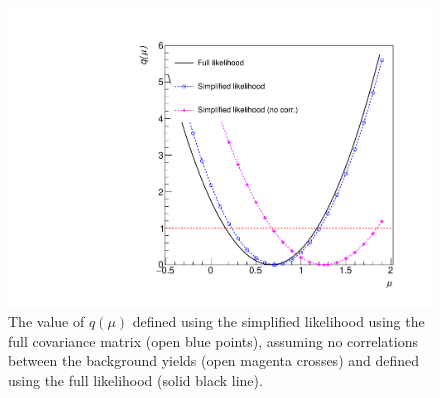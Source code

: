 \begin{figure}[hbt]
  \begin{center} 
   \includegraphics[width=1.5\cmsFigWidth]{figures/r.pdf}
   \caption{The value of $q(\mu)$ defined using the simplified likelihood using the full covariance matrix (open blue points), assuming no correlations between the 
   background yields (open magenta crosses) and defined using the full likelihood (solid black line).}
   \label{fig:likelihoodscan} 
  \end{center}
\end{figure}


